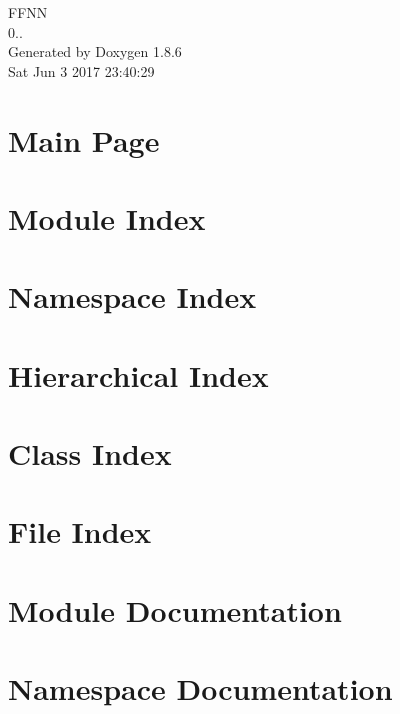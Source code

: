 \documentclass[twoside]{book}
\newcommand{\clearemptydoublepage}{%
  \newpage{\pagestyle{empty}\cleardoublepage}%
}
\begin{document}
\hypersetup{pageanchor=false}
\begin{titlepage}
\vspace*{7cm}
\begin{center}%
{\Large F\-F\-N\-N \\[1ex]\large 0.. }\\
\vspace*{1cm}
{\large Generated by Doxygen 1.8.6}\\
\vspace*{0.5cm}
{\small Sat Jun 3 2017 23:40:29}\\
\end{center}
\end{titlepage}
\clearemptydoublepage
\tableofcontents
\clearemptydoublepage
{}
\hypersetup{pageanchor=true}

\chapter{Main Page}
\label{index}\hypertarget{index}{}
\chapter{Module Index}

\chapter{Namespace Index}

\chapter{Hierarchical Index}

\chapter{Class Index}

\chapter{File Index}

\chapter{Module Documentation}

\chapter{Namespace Documentation}


















\end{document}
